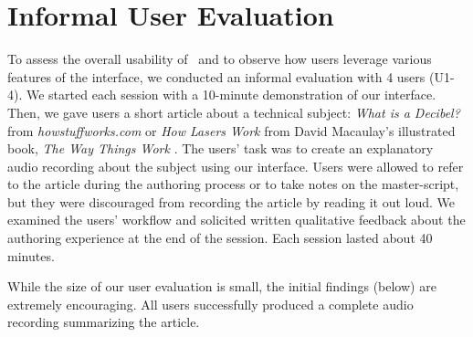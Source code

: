\section{Informal User Evaluation}


To assess the overall usability of \systemname\ and to observe how users leverage various features of the interface, we conducted an informal evaluation with 4 users (U1-4). We started each session with a 10-minute demonstration of our interface. Then, we gave users a short article about a technical subject: \textit{What
is a Decibel?} from \textit{howstuffworks.com} \cite{howstuffworks} or \textit{How Lasers Work} from
David Macaulay's illustrated book, \textit{The Way Things Work}
\cite{macaulay1999way}. The users' task was to create an explanatory audio recording about the subject using our interface. Users were allowed to refer to the article during the authoring process or to take notes on the master-script, but they were discouraged from recording the article by reading it out loud. We examined the users' workflow and solicited written qualitative feedback about the authoring experience at the end of the session. Each session lasted about 40 minutes.

While the size of our user evaluation is small, the initial findings (below) are extremely encouraging. All users successfully produced a complete audio recording summarizing the article. %



